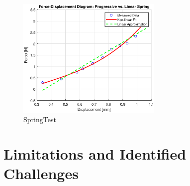 \begin{figure}[H]
    \centering
    \includegraphics[width=0.62\textwidth]{img/SpringTest.eps}
    \caption[SpringTest]{SpringTest}
    \label{fig:SpringTest}
\end{figure}


\section{Limitations and Identified Challenges}
